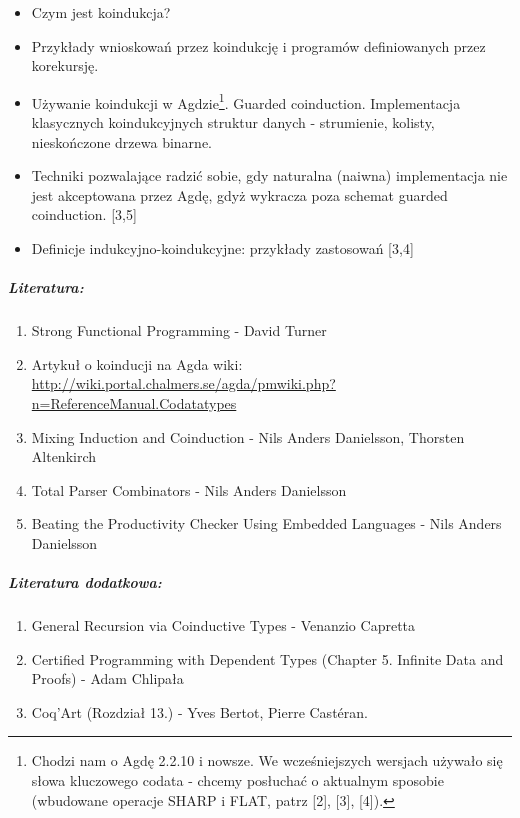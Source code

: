 \documentclass[10pt, a4paper]{article}
\begin{document}
\begin{itemize}
\addtolength{\itemsep}{-0.5\baselineskip}

 \item Czym jest koindukcja?
 \item Przykłady wnioskowań przez koindukcję i programów definiowanych przez korekursję.
 \item Używanie koindukcji w Agdzie\footnote{
Chodzi nam o Agdę 2.2.10 i nowsze. We wcześniejszych wersjach używało się słowa kluczowego codata - chcemy posłuchać o aktualnym sposobie (wbudowane operacje SHARP i FLAT, patrz [2], [3], [4]).
}. Guarded coinduction. Implementacja klasycznych koindukcyjnych struktur danych - strumienie, kolisty, nieskończone drzewa binarne.
 \item Techniki pozwalające radzić sobie, gdy naturalna (naiwna) implementacja nie jest akceptowana przez Agdę, gdyż wykracza poza schemat guarded coinduction. [3,5]
 \item Definicje indukcyjno-koindukcyjne: przykłady zastosowań [3,4]
\end{itemize}

\subparagraph{Literatura:}

\begin{enumerate}
\addtolength{\itemsep}{-0.5\baselineskip}
 \item Strong Functional Programming - David Turner
 \item Artykuł o koinducji na Agda wiki: \\ {\small
       \url{http://wiki.portal.chalmers.se/agda/pmwiki.php?n=ReferenceManual.Codatatypes}
      }
 \item Mixing Induction and Coinduction - Nils Anders Danielsson, Thorsten Altenkirch
 \item Total Parser Combinators - Nils Anders Danielsson
 \item Beating the Productivity Checker Using Embedded Languages - Nils Anders Danielsson
\end{enumerate}

\subparagraph{Literatura dodatkowa:}

\begin{enumerate}
\addtolength{\itemsep}{-0.5\baselineskip}
 \item General Recursion via Coinductive Types - Venanzio Capretta
 \item Certified Programming with Dependent Types (Chapter 5. Infinite Data and Proofs) - Adam Chlipała
 \item Coq’Art (Rozdział 13.) - Yves Bertot, Pierre Castéran.
\end{enumerate}
\end{document}
